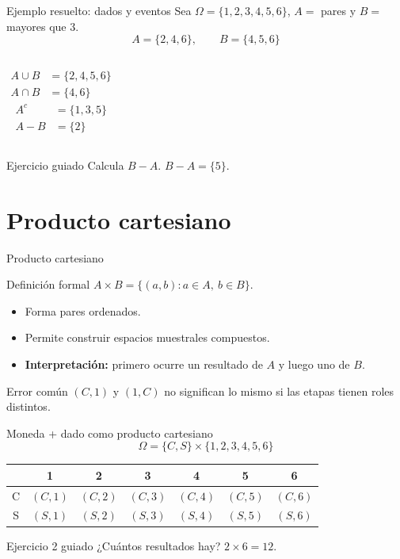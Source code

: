 \documentclass[aspectratio=169,11pt]{beamer}
\begin{document}
\begin{frame}{Ejemplo resuelto: dados y eventos}
Sea $\Omega=\{1,2,3,4,5,6\}$, $A=$ pares y $B=$ mayores que 3.
\[
A=\{2,4,6\},\qquad B=\{4,5,6\}
\]
\pause
\begin{columns}[T]
\begin{align*}
A\cup B&=\{2,4,5,6\}\\
A\cap B&=\{4,6\}
\end{align*}
\begin{align*}
A^c&=\{1,3,5\}\\
A-B&=\{2\}
\end{align*}
\end{columns}
\begin{exampleblock}{Ejercicio guiado}
Calcula $B-A$. \pause $B-A=\{5\}$.
\end{exampleblock}
\end{frame}

\section{Producto cartesiano}

\begin{frame}{Producto cartesiano}
\begin{block}{Definición formal}
$A\times B=\{(a,b):a\in A,\ b\in B\}$.
\end{block}
\begin{itemize}
  \item Forma pares ordenados.
  \item Permite construir espacios muestrales compuestos.
  \item \textbf{Interpretación:} primero ocurre un resultado de $A$ y luego uno de $B$.
\end{itemize}
\begin{alertblock}{Error común}
$(C,1)$ y $(1,C)$ no significan lo mismo si las etapas tienen roles distintos.
\end{alertblock}
\end{frame}

\begin{frame}{Moneda + dado como producto cartesiano}
\small
\[
\Omega=\{C,S\}\times\{1,2,3,4,5,6\}
\]
\begin{center}
\begin{tabular}{c|cccccc}
 & 1 & 2 & 3 & 4 & 5 & 6 \\
\hline
C & $(C,1)$ & $(C,2)$ & $(C,3)$ & $(C,4)$ & $(C,5)$ & $(C,6)$ \\
S & $(S,1)$ & $(S,2)$ & $(S,3)$ & $(S,4)$ & $(S,5)$ & $(S,6)$ \\
\end{tabular}
\end{center}
\begin{exampleblock}{Ejercicio 2 guiado}
¿Cuántos resultados hay? \pause $2\times6=12$.
\end{exampleblock}
\end{frame}
\end{document}
